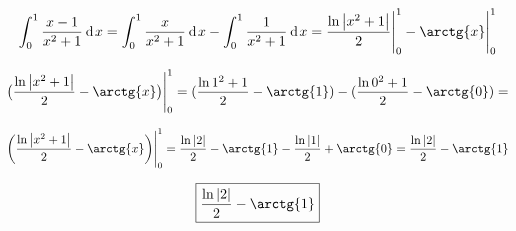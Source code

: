 {}

$$
  \int^1_0 \dfrac{x-1}{x^2+1}\d{x}  = \int^1_0 \dfrac{x}{x^2+1}\d{x} - \int^1_0 \dfrac{1}{x^2+1}\d{x} = \dfrac{\ln \big|x^2+1\big|}{2} \Bigg|^1_0 - \arctg{x} \Bigg|^1_0
$$

$$
 \big( \dfrac{\ln \big|x^2+1\big|}{2} - \arctg{x} \big) \Bigg|^1_0 = (\dfrac{\ln{1^2+1}}{2} - \arctg{1}) - (\dfrac{\ln{0^2+1}}{2} - \arctg{0}) =
$$

$$
 \bigg( \dfrac{\ln \big|x^2+1\big|}{2} - \arctg{x} \bigg) \Bigg|^1_0
 = \dfrac{\ln{|2|}}{2} - \arctg{1}  - \dfrac{\ln{|1|}}{2} + \arctg{0}
 = \dfrac{\ln{|2|}}{2} - \arctg{1}
$$

$$
  \boxed{ \dfrac{\ln{|2|}}{2} - \arctg{1} }
$$

